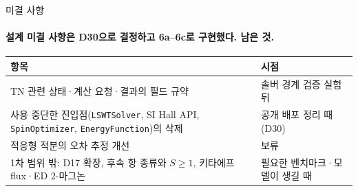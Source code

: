 \begin{frame}[label=open-questions]{미결 사항}
  \framesubtitle{설계 미결 사항은 D30으로 결정하고 6a--6c로 구현했다. 남은 것.}
  \footnotesize\renewcommand{\arraystretch}{1.05}
  \begin{tabularx}{\textwidth}{@{}Yp{3.4cm}@{}}
    \toprule
    항목 & 시점 \\
    \midrule
    TN 관련 상태·계산 요청·결과의 필드 규약 & 솔버 경계 검증 실험 뒤 \\
    사용 중단한 진입점(\texttt{LSWTSolver}, SI Hall API, \texttt{SpinOptimizer}, \texttt{EnergyFunction})의 삭제 & 공개 배포 정리 때(D30) \\
    적응형 적분의 오차 추정 개선 & 보류 \\
    1차 범위 밖: D17 확장, 후속 항 종류와 $S\ge1$, 키타에프 flux·ED 2-마그논 & 필요한 벤치마크·모델이 생길 때 \\
    \bottomrule
  \end{tabularx}
  \par\medskip
\end{frame}
